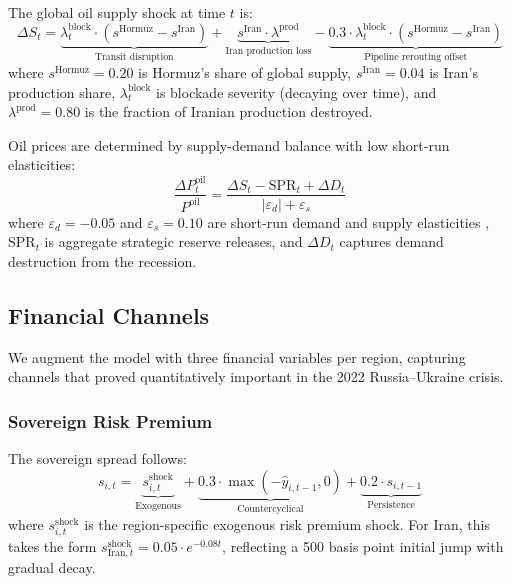 \documentclass[12pt,a4paper]{article}
\begin{document}
The global oil supply shock at time $t$ is:
\begin{equation}
\Delta S_t = \underbrace{\lambda^{\text{block}}_t \cdot (s^{\text{Hormuz}} - s^{\text{Iran}})}_{\text{Transit disruption}} + \underbrace{s^{\text{Iran}} \cdot \lambda^{\text{prod}}}_{\text{Iran production loss}} - \underbrace{0.3 \cdot \lambda^{\text{block}}_t \cdot (s^{\text{Hormuz}} - s^{\text{Iran}})}_{\text{Pipeline rerouting offset}}
\label{eq:oil_supply}
\end{equation}
where $s^{\text{Hormuz}} = 0.20$ is Hormuz's share of global supply, $s^{\text{Iran}} = 0.04$ is Iran's production share, $\lambda^{\text{block}}_t$ is blockade severity (decaying over time), and $\lambda^{\text{prod}} = 0.80$ is the fraction of Iranian production destroyed.

Oil prices are determined by supply-demand balance with low short-run elasticities:
\begin{equation}
\frac{\Delta P^{\text{oil}}_t}{P^{\text{oil}}} = \frac{\Delta S_t - \text{SPR}_t + \Delta D_t}{|\varepsilon_d| + \varepsilon_s}
\label{eq:oil_price}
\end{equation}
where $\varepsilon_d = -0.05$ and $\varepsilon_s = 0.10$ are short-run demand and supply elasticities \citep{hamilton2009understanding}, $\text{SPR}_t$ is aggregate strategic reserve releases, and $\Delta D_t$ captures demand destruction from the recession.

\subsection{Financial Channels}

We augment the model with three financial variables per region, capturing channels that proved quantitatively important in the 2022 Russia--Ukraine crisis.

\subsubsection{Sovereign Risk Premium}

The sovereign spread follows:
\begin{equation}
s_{i,t} = \underbrace{s^{\text{shock}}_{i,t}}_{\text{Exogenous}} + \underbrace{0.3 \cdot \max(-\hat{y}_{i,t-1}, 0)}_{\text{Countercyclical}} + \underbrace{0.2 \cdot s_{i,t-1}}_{\text{Persistence}}
\label{eq:spread}
\end{equation}
where $s^{\text{shock}}_{i,t}$ is the region-specific exogenous risk premium shock. For Iran, this takes the form $s^{\text{shock}}_{\text{Iran},t} = 0.05 \cdot e^{-0.08t}$, reflecting a 500 basis point initial jump with gradual decay.
\end{document}
